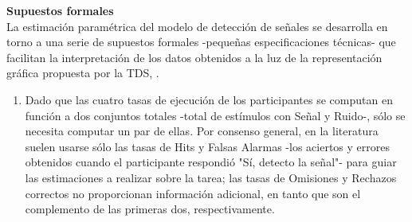   \textbf{Supuestos formales}\\

La estimación paramétrica del modelo de detección de señales se desarrolla en torno a una serie de supuestos formales -pequeñas especificaciones técnicas- que facilitan la interpretación de los datos obtenidos a la luz de la representación gráfica propuesta por la TDS, \parencite{Wickens, Gescheider, Stainslaw1999}.\\ 

\begin{enumerate}

\item  Dado que las cuatro tasas de ejecución de los participantes se computan en función a dos conjuntos totales -total de estímulos con Señal y Ruido-, sólo se necesita computar un par de ellas. Por consenso general, en la literatura suelen usarse sólo las tasas de Hits y Falsas Alarmas -los aciertos y errores obtenidos cuando el participante respondió "Sí, detecto la señal"- para guiar las estimaciones a realizar sobre la tarea; las tasas de Omisiones y Rechazos correctos no proporcionan información adicional, en tanto que son el complemento de las primeras dos, respectivamente.\\


\end{enumerate}

